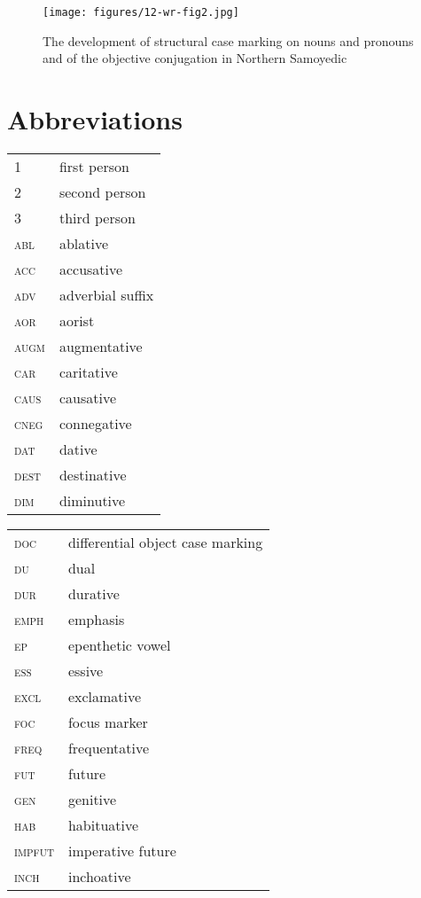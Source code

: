 \documentclass[output=paper]{LSP/langsci}
\begin{document}
\begin{figure}[!h] %
	\centering
	\texttt{[image: figures/12-wr-fig2.jpg]} %
	\caption{The development of structural case marking on nouns and pronouns and of the objective conjugation in Northern Samoyedic}\label{12-wr-fig:2}
\end{figure}


\section*{Abbreviations}

\begin{tabularx}{.45\textwidth}{lQ}
1 &first person\\
2 &second person\\
3 &third person\\
\textsc{abl} & ablative\\
\textsc{acc} & accusative\\
\textsc{adv} & adverbial suffix\\
\textsc{aor} & aorist\\
\textsc{augm} & augmentative\\
\textsc{car} & caritative\\
\textsc{caus} & causative\\
\textsc{cneg} & connegative\\
\textsc{dat} & dative\\
\textsc{dest} & destinative\\
\textsc{dim} & diminutive\\
\end{tabularx}
\begin{tabularx}{.49\textwidth}{ll}
\textsc{doc} & differential object case marking\\
\textsc{du} & dual\\
\textsc{dur} & durative\\
\textsc{emph} & emphasis\\
\textsc{ep} & epenthetic vowel\\
\textsc{ess} & essive\\
\textsc{excl} & exclamative\\
\textsc{foc} & focus marker\\
\textsc{freq} & frequentative\\
\textsc{fut} & future\\
\textsc{gen} & genitive\\
\textsc{hab} & habituative\\
\textsc{impfut} & imperative future\\
\textsc{inch} & inchoative\\
\end{tabularx}
\end{document}
